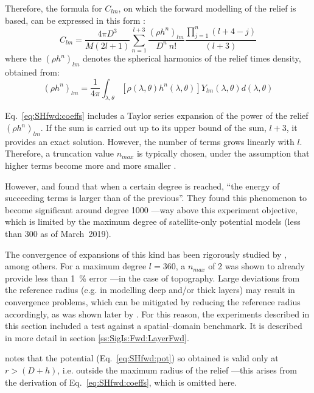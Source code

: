 Therefore, the formula for $C_{lm}$, on which the forward modelling of the relief is based, can be expressed in this form \parencite{Wieczorek2007}:
\begin{equation}
    \label{eq:SHfwd:coeffs}
    C_{lm} =
    \frac{4 \pi D^3}{M(2l+1)}
    \sum_{n=1}^{l+3}
    \frac{(\rho h^n)_{lm}}{D^n \ n!}
    \frac{\prod_{j=1}^{n}(l+4-j)}{(l+3)}
\end{equation}
where the $(\rho h^n)_{lm}$ denotes the spherical harmonics of the relief times density, obtained from:
\begin{equation}
    \label{eq:SHfwd:reliefSH}
    (\rho h^n)_{lm} =
    \frac{1}{4 \pi}
    \int_{\lambda, \theta}
    \left[ \rho(\lambda, \theta) h^n(\lambda, \theta) \right]
    Y_{lm}(\lambda, \theta) d(\lambda, \theta)
\end{equation}

Eq.~\ref{eq:SHfwd:coeffs} includes a Taylor series expansion of the power of the relief $(\rho h^n)_{lm}$.
If the sum is carried out up to its upper bound of the sum, $l+3$, it provides an exact solution.
However, the number of terms grows linearly with $l$.
Therefore, a truncation value $n_{max}$ is typically chosen, under the assumption that higher terms become more and more smaller \parencite{Wieczorek2007}.

However, \textcite{Balmino2012} and \textcite{Hirt2017} found that when a certain degree is reached, ``the energy of succeeding terms is larger than of the previous''.
They found this phenomenon to become significant around degree \num{1000} ---way above this experiment objective, which is limited by the maximum degree of satellite-only potential models (less than \num{300} as of March~2019).

The convergence of expansions of this kind has been rigorously studied by \textcite{Sun2001}, among others.
For a maximum degree $l = \num{360}$, a $n_{max}$ of \num{2} was shown to already provide less than \SI{1}{\percent} error ---in the case of topography.
Large deviations from the reference radius (e.g. in modelling deep and/or thick layers) may result in convergence problems, which can be mitigated by reducing the reference radius accordingly, as was shown later by \textcite{Root2015}.
For this reason, the experiments described in this section included a test against a spatial--domain benchmark.
It is described in more detail in section \ref{ss:SigIs:Fwd:LayerFwd}.

\Textcite{Wieczorek2007} notes that the potential (Eq.~\ref{eq:SHfwd:pot}) so obtained is valid only at $r > (D + h)$, i.e. outside the maximum radius of the relief ---this arises from the derivation of Eq.~\ref{eq:SHfwd:coeffs}, which is omitted here.


